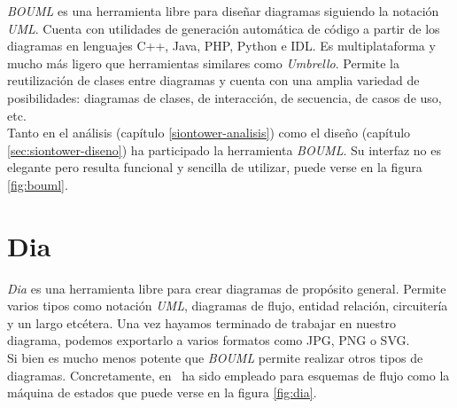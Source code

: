 \textit{BOUML} \cite{website:bouml} es una herramienta libre para diseñar
diagramas siguiendo la notación \textit{UML}. Cuenta con utilidades de generación
automática de código a partir de los diagramas en lenguajes C++, Java, PHP,
Python e IDL. Es multiplataforma y mucho más ligero que herramientas similares
como \textit{Umbrello}. Permite la reutilización de clases entre diagramas
y cuenta con una amplia variedad de posibilidades: diagramas de clases, 
de interacción, de secuencia, de casos de uso, etc.\\

Tanto en el análisis (capítulo \ref{siontower-analisis}) como el diseño
(capítulo \ref{sec:siontower-diseno}) ha participado la herramienta \textit{BOUML}.
Su interfaz no es elegante pero resulta funcional y sencilla de utilizar,
puede verse en la figura \ref{fig:bouml}.\\


\section*{Dia}

\textit{Dia} \cite{website:dia} es una herramienta libre para crear diagramas
de propósito general. Permite varios tipos como notación \textit{UML},
diagramas de flujo, entidad relación, circuitería y un largo etcétera. Una vez
hayamos terminado de trabajar en nuestro diagrama, podemos exportarlo a
varios formatos como JPG, PNG o SVG.\\

Si bien es mucho menos potente que \textit{BOUML} permite realizar otros
tipos de diagramas. Concretamente, en \juego\ ha sido empleado para esquemas
de flujo como la máquina de estados que puede verse en la figura \ref{fig:dia}.\\

